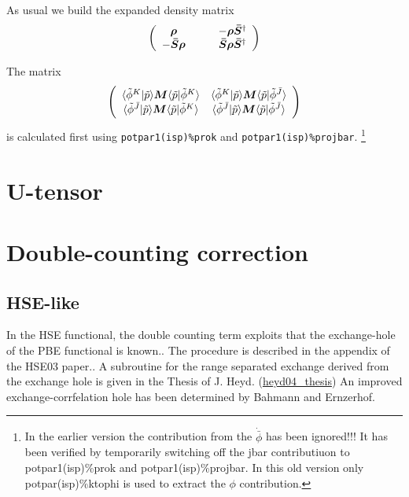 \documentclass[11pt,a4paper]{report}
\begin{document}
As usual we build the expanded density matrix
\begin{eqnarray}
\left(\begin{array}{cc}
  \bm{\rho} \qquad& 
-\bm{\rho}\bm{\bar{S}}^\dagger\\
-\bm{\bar{S}}\bm{\rho} \qquad& 
\bm{\bar{S}}\bm{\rho}\bm{\bar{S}}^\dagger\\
\end{array}\right)
\end{eqnarray}

The matrix 
\begin{eqnarray}
\left(\begin{array}{cc}
\langle\tilde{\phi}^{K}|\tilde{p}\rangle 
\bm{M}\langle\tilde{p}|\tilde{\phi}^{K}\rangle &
\langle\tilde{\phi}^{K}|\tilde{p}\rangle 
\bm{M}\langle\tilde{p}|\tilde{\phi}^{\bar{J}}\rangle \\
\langle\tilde{\phi}^{\bar{J}}|\tilde{p}\rangle 
\bm{M}\langle\tilde{p}|\tilde{\phi}^{K}\rangle &
\langle\tilde{\phi}^{\bar{J}}|\tilde{p}\rangle 
\bm{M}\langle\tilde{p}|\tilde{\phi}^{\bar{J}}\rangle \\
\end{array}\right)
\end{eqnarray}
is calculated first using \verb|potpar1(isp)%prok| and
\verb|potpar1(isp)%projbar|.
\footnote{ In the earlier version the contribution from the
  $\dot{\bar{\phi}}$ has been ignored!!! It has been verified by
  temporarily switching off the jbar contributiuon to
  potpar1(isp)\%prok and potpar1(isp)\%projbar. In this old version
  only potpar(isp)\%ktophi is used to extract the $\phi$
  contribution.}

\section{U-tensor}
\section{Double-counting correction}


\subsection{HSE-like}
In the HSE functional\cite{heyd03_jcp118_8207}, the double counting
term exploits that the exchange-hole of the PBE functional is
known.\cite{ernzerhof98_jcp109_3313}. The procedure is described in
the appendix of the HSE03 paper.\cite{heyd03_jcp118_8207}. A
subroutine for the range separated exchange derived from the exchange
hole is given in the Thesis of J. Heyd. (\url{heyd04_thesis}) An
improved exchange-corrfelation hole has been determined by Bahmann and
Ernzerhof\cite{bahmann08_jcp128_234104}.
\end{document}

